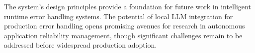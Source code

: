 The system's design principles provide a foundation for future work in intelligent runtime error handling systems. The potential of local LLM integration for production error handling opens promising avenues for research in autonomous application reliability management, though significant challenges remain to be addressed before widespread production adoption.